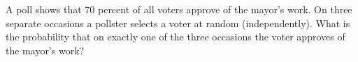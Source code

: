 A poll shows that \(70\) percent of all voters approve of the mayor's work. On three separate occasions a pollster selects a voter at random (independently). What is the probability that on exactly one of the three occasions the voter approves of the mayor's work?
